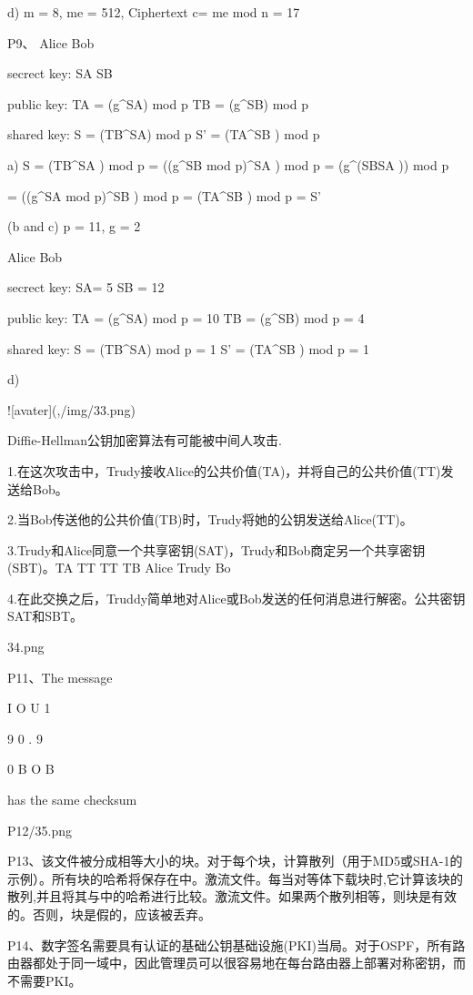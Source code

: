 \documentclass[11pt,UTF8,twoside]{article}
\begin{document}
{		d) m = 8, me = 512, Ciphertext c= me mod n = 17 

		
		P9、 Alice Bob 

		secrect key: SA SB

		public key: TA = (g^SA) mod p TB = (g^SB) mod p 

		shared key: S = (TB^SA) mod p S' = (TA^SB ) mod p 

		a) S = (TB^SA ) mod p = ((g^SB mod p)^SA ) mod p = (g^(SBSA )) mod p 

		= ((g^SA mod p)^SB ) mod p = (TA^SB ) mod p = S' 

		(b and c) p = 11, g = 2 

		Alice Bob 

		secrect key: SA= 5 SB = 12 

		public key: TA = (g^SA) mod p = 10 TB = (g^SB) mod p = 4 

		shared key: S = (TB^SA) mod p = 1 S' = (TA^SB ) mod p = 1 

		d) 

		
		![avater](,/img/33.png)
		
		Diffie-Hellman公钥加密算法有可能被中间人攻击.
		
		1.在这次攻击中，Trudy接收Alice的公共价值(TA)，并将自己的公共价值(TT)发送给Bob。
		
		2.当Bob传送他的公共价值(TB)时，Trudy将她的公钥发送给Alice(TT)。
		
		3.Trudy和Alice同意一个共享密钥(SAT)，Trudy和Bob商定另一个共享密钥(SBT)。TA TT TT TB Alice Trudy Bo
		
		4.在此交换之后，Truddy简单地对Alice或Bob发送的任何消息进行解密。公共密钥SAT和SBT。
		
		34.png
		
		P11、The message 

		I O U 1 

		9 0 . 9 

		0 B O B 

		has the same checksum 

		
		P12/35.png
		
		P13、该文件被分成相等大小的块。对于每个块，计算散列（用于MD5或SHA-1的示例）。所有块的哈希将保存在中。激流文件。每当对等体下载块时,它计算该块的散列,并且将其与中的哈希进行比较。激流文件。如果两个散列相等，则块是有效的。否则，块是假的，应该被丢弃。
		
		P14、数字签名需要具有认证的基础公钥基础设施(PKI)当局。对于OSPF，所有路由器都处于同一域中，因此管理员可以很容易地在每台路由器上部署对称密钥，而不需要PKI。
		
}
\end{document}
